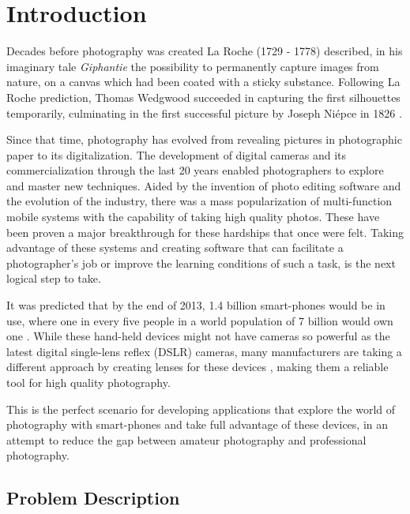 % 
%  
%
\chapter{Introduction}
\label{cha:intro}

Decades before photography was created La Roche (1729 - 1778) described, in his imaginary tale \emph{Giphantie} the possibility to permanently capture images from nature, on a canvas which had been coated with a sticky substance. Following La Roche prediction, Thomas Wedgwood succeeded in capturing the first silhouettes temporarily, culminating in the first successful picture by Joseph Niépce in 1826 \cite{Leggat1995}. 

Since that time, photography has evolved from revealing pictures in photographic paper to its digitalization. The development of digital cameras and its commercialization through the last 20 years enabled photographers to explore and master new techniques.
Aided by the invention of photo editing software and the evolution of the industry, there was a mass popularization of multi-function mobile systems with the capability of taking high quality photos. These have been proven a major breakthrough for these hardships that once were felt.
Taking advantage of these systems and creating software that can facilitate a photographer's job or improve the learning conditions of such a task, is the next logical step to take.

It was predicted that by the end of 2013, 1.4 billion smart-phones would be in use, where one in every five people in a world population of 7 billion would own one \cite{Leonard2013}. While these hand-held devices might not have cameras so powerful as the latest digital single-lens reflex (DSLR) cameras, many manufacturers are taking a different approach by creating lenses for these devices \cite{Bolton2013}, making them a reliable tool for high quality photography.

This is the perfect scenario for developing applications that explore the world of photography with smart-phones and take full advantage of these devices, in an attempt to reduce the gap between amateur photography and professional photography.

\section{Problem Description}

